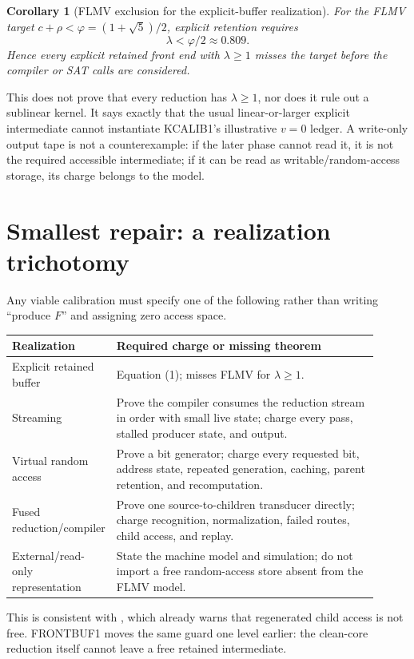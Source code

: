 \documentclass[11pt]{article}
\newtheorem{corollary}{Corollary}
\begin{document}
\begin{corollary}[FLMV exclusion for the explicit-buffer realization]
For the FLMV target $c+\rho<\varphi=(1+\sqrt5)/2$, explicit retention requires
\[
 \lambda<\varphi/2\approx0.809. \tag{2}
\]
Hence every explicit retained front end with $\lambda\ge1$ misses the target
before the compiler or SAT calls are considered.
\end{corollary}

This does not prove that every reduction has $\lambda\ge1$, nor does it rule
out a sublinear kernel.  It says exactly that the usual linear-or-larger
explicit intermediate cannot instantiate KCALIB1's illustrative $v=0$
ledger.  A write-only output tape is not a counterexample: if the later phase
cannot read it, it is not the required accessible intermediate; if it can be
read as writable/random-access storage, its charge belongs to the model.

\section{Smallest repair: a realization trichotomy}
Any viable calibration must specify one of the following rather than writing
``produce $F$'' and assigning zero access space.
\begin{longtable}{p{0.19\linewidth}p{0.72\linewidth}}
\toprule Realization & Required charge or missing theorem\\ \midrule
Explicit retained buffer & Equation (1); misses FLMV for $\lambda\ge1$.\\
Streaming & Prove the compiler consumes the reduction stream in order with
small live state; charge every pass, stalled producer state, and output.\\
Virtual random access & Prove a bit generator; charge every requested bit,
address state, repeated generation, caching, parent retention, and
recomputation.\\
Fused reduction/compiler & Prove one source-to-children transducer directly;
charge recognition, normalization, failed routes, child access, and replay.\\
External/read-only representation & State the machine model and simulation;
do not import a free random-access store absent from the FLMV model.\\
\bottomrule
\end{longtable}

This is consistent with , which already warns that regenerated
child access is not free.  FRONTBUF1 moves the same guard one level earlier:
the clean-core reduction itself cannot leave a free retained intermediate.
\end{document}
